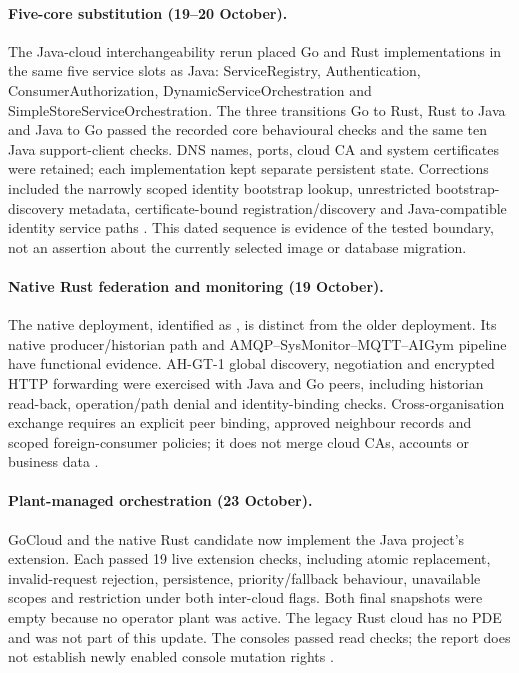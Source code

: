 \documentclass[a4paper]{arrowhead}
\newcommand{\svc}[1]{\textcolor{ArrowheadPurple}{\textit{\ahbreak{#1}}}}    %
\begin{document}
\paragraph{Five-core substitution (19--20 October).}
The Java-cloud interchangeability rerun placed Go and Rust implementations in the
same five service slots as Java: ServiceRegistry, Authentication,
ConsumerAuthorization, DynamicServiceOrchestration and SimpleStoreServiceOrchestration.
The three transitions Go to Rust, Rust to Java and Java to Go passed the recorded
core behavioural checks and the same ten Java support-client checks. DNS names,
ports, cloud CA and system certificates were retained; each implementation kept
separate persistent state. Corrections included the narrowly scoped identity
bootstrap lookup, unrestricted bootstrap-discovery metadata, certificate-bound
registration/discovery and Java-compatible identity service paths
\cite{coreSwaps20261020}. This dated sequence is evidence of the tested boundary,
not an assertion about the currently selected image or database migration.

\paragraph{Native Rust federation and monitoring (19 October).}
The native  deployment, identified as
, is distinct from the older
 deployment. Its native producer/historian
path and AMQP--SysMonitor--MQTT--AIGym pipeline have functional evidence.
AH-GT-1 global discovery, negotiation and encrypted HTTP forwarding were exercised
with Java and Go peers, including historian read-back, operation/path denial and
identity-binding checks. Cross-organisation exchange requires an explicit
 peer binding, approved neighbour records and scoped
foreign-consumer policies; it does not merge cloud CAs, accounts or business data
\cite{rustFederation20261019}.

\paragraph{Plant-managed orchestration (23 October).}
GoCloud and the native Rust candidate now implement the Java project's
\svc{serviceOrchestrationPlantManagement} extension. Each passed 19 live extension
checks, including atomic replacement, invalid-request rejection, persistence,
priority/fallback behaviour, unavailable scopes and restriction under both
inter-cloud flags. Both final snapshots were empty because no operator plant
was active. The legacy Rust cloud has no PDE and was not part of this update.
The consoles passed read checks; the report does not establish newly enabled
console mutation rights \cite{nativePde20261023}.
\end{document}
